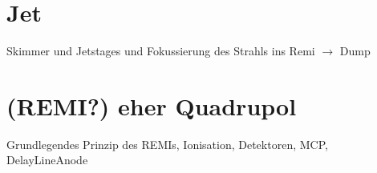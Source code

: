 

\newpage

\section{Jet}

Skimmer und Jetstages und Fokussierung des Strahls ins Remi $\mathrm{\rightarrow}$ Dump


\section{(REMI?) eher Quadrupol}

Grundlegendes Prinzip des REMIs, Ionisation, Detektoren, MCP, DelayLineAnode


